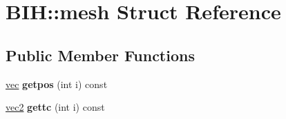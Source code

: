 \hypertarget{struct_b_i_h_1_1mesh}{}\section{B\+IH\+:\+:mesh Struct Reference}
\label{struct_b_i_h_1_1mesh}
\subsection*{Public Member Functions}
\begin{DoxyCompactItemize}
\item 
\mbox{\label{struct_b_i_h_1_1mesh_ae7e372bff00877e46a64b7be31474784}} 
\hyperlink{structvec}{vec} {\bfseries getpos} (int i) const
\item 
\mbox{\label{struct_b_i_h_1_1mesh_a725d771514c864a1d22904d7b12b1312}} 
\hyperlink{structvec2}{vec2} {\bfseries gettc} (int i) const
\end{DoxyCompactItemize}
